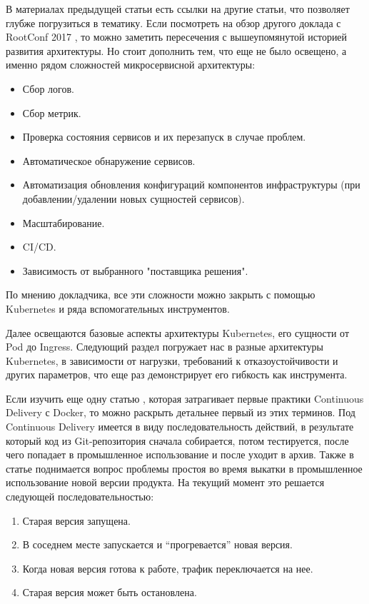 В материалах предыдущей статьи есть ссылки на другие статьи, что позволяет глубже погрузиться в тематику. Если посмотреть на обзор другого доклада с RootConf 2017 \cite{habr:flant:k8s-small-projects}, то можно заметить пересечения с вышеупомянутой историей развития архитектуры. Но стоит дополнить тем, что еще не было освещено, а именно рядом сложностей микросервисной архитектуры:
\begin{itemize}
    \item Сбор логов.
    \item Сбор метрик.
    \item Проверка состояния сервисов и их перезапуск в случае проблем.
    \item Автоматическое обнаружение сервисов.
    \item Автоматизация обновления конфигураций компонентов инфраструктуры (при добавлении/удалении новых сущностей сервисов).
    \item Масштабирование.
    \item CI/CD.
    \item Зависимость от выбранного "поставщика решения".
\end{itemize}

По мнению докладчика, все эти сложности можно закрыть с помощью Kubernetes и ряда вспомогательных инструментов.

Далее освещаются базовые аспекты архитектуры Kubernetes, его сущности от Pod до Ingress. Следующий раздел погружает нас в разные архитектуры Kubernetes, в зависимости от нагрузки, требований к отказоустойчивости и других параметров, что еще раз демонстрирует его гибкость как инструмента.

Если изучить еще одну статью \cite{habr:flant:cd-docker}, которая затрагивает первые практики Continuous Delivery с Docker, то можно раскрыть детальнее первый из этих терминов. Под Continuous Delivery имеется в виду последовательность действий, в результате который код из Git-репозитория сначала собирается, потом тестируется, после чего попадает в промышленное использование и после уходит в архив. Также в статье поднимается вопрос проблемы простоя во время выкатки в промышленное использование новой версии продукта. На текущий момент это решается следующей последовательностью:
\begin{enumerate}
    \item Старая версия запущена.
    \item В соседнем месте запускается и “прогревается” новая версия.
    \item Когда новая версия готова к работе, трафик переключается на нее.
    \item Старая версия может быть остановлена.
\end{enumerate}

